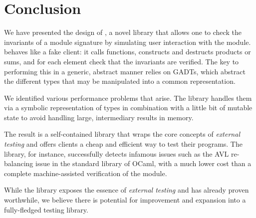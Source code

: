 \section*{Conclusion}

We have presented the design of \arti, a novel library that allows one to check
the invariants of a module signature by simulating user interaction with the
module. \arti behaves like a fake client: it calls functions, constructs and
destructs products or sums, and for each element check that the invariants are
verified. The key to performing this in a generic, abstract manner relies on
GADTs, which abstract the different types that may be manipulated into a common
representation.

We identified various performance problems that arise. The library handles them
via a symbolic representation of types in combination with a little bit of
mutable state to avoid handling large, intermediary results in memory.

The result is a self-contained library that wraps the core concepts of
\emph{external testing} and offers clients a cheap and efficient way to test
their programs. The library, for instance, successfully detects infamous issues
such as the AVL re-balancing issue in the standard library of OCaml, with a much
lower cost than a complete machine-assisted verification of the module.

While the library exposes the essence of \emph{external testing} and has already
proven worthwhile, we believe there is potential for improvement and expansion
into a fully-fledged testing library.
